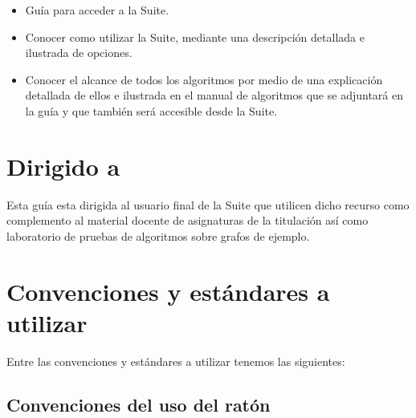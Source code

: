 \begin{itemize}
\item Guía para acceder a la Suite.
\item Conocer como utilizar la Suite, mediante una descripción detallada e ilustrada de opciones.
\item Conocer el alcance de todos los algoritmos por medio de una explicación detallada de ellos e ilustrada en el manual de algoritmos que se adjuntará en la guía y que también será accesible desde la Suite.
\end{itemize}

\section{Dirigido a}

Esta guía esta dirigida al usuario final de la Suite que utilicen dicho recurso como complemento al material docente de asignaturas de la titulación así como laboratorio de pruebas de algoritmos sobre grafos de ejemplo.

\section{Convenciones y estándares a utilizar}

Entre las convenciones y estándares a utilizar tenemos las siguientes:

\subsection{Convenciones del uso del ratón}

